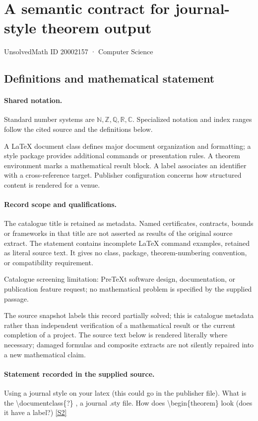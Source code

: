 \documentclass[11pt]{article}
\newcommand{\sref}[2]{\hyperlink{source:#1:#2}{[S#2]}}
\begin{document}
\setcounter{section}{20002156}
\section{A semantic contract for journal-style theorem output}\label{20002157}
{\small\sffamily UnsolvedMath ID 20002157 · Computer Science}
\subsection{Definitions and mathematical statement}

\paragraph{Shared notation.}Standard number systems are $\mathbb N,\mathbb Z,\mathbb Q,\mathbb R,\mathbb C$. Specialized notation and index ranges follow the cited source and the definitions below.


A LaTeX document class defines major document organization and formatting; a style package provides additional commands or presentation rules. A theorem environment marks a mathematical result block. A label associates an identifier with a cross-reference target. Publisher configuration concerns how structured content is rendered for a venue.
\paragraph{Record scope and qualifications.}
The catalogue title is retained as metadata. Named certificates, contracts, bounds or frameworks in that title are not asserted as results of the original source extract.
The statement contains incomplete LaTeX command examples, retained as literal source text. It gives no class, package, theorem-numbering convention, or compatibility requirement.

Catalogue screening limitation: PreTeXt software design, documentation, or publication feature request; no mathematical problem is specified by the supplied passage.

The source snapshot labels this record partially solved; this is catalogue metadata rather than independent verification of a mathematical result or the current completion of a project.
The source text below is rendered literally where necessary; damaged formulas and composite extracts are not silently repaired into a new mathematical claim.
\paragraph{Statement recorded in the supplied source.}
Using a journal style on your latex (this could go in the publisher file). What is the \textbackslash{}documentclass\{?\} , a journal .sty file. How does \textbackslash{}begin\{theorem\} look (does it have a label?) \sref{20002157}{2}
\end{document}
